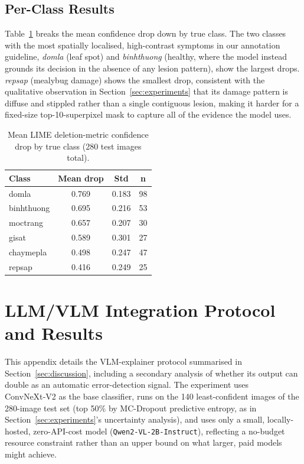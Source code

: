 \subsection{Per-Class Results}

Table~\ref{tab:lime_per_class} breaks the mean confidence drop down by true class. The two classes with the most spatially localised, high-contrast symptoms in our annotation guideline, \textit{domla} (leaf spot) and \textit{binhthuong} (healthy, where the model instead grounds its decision in the absence of any lesion pattern), show the largest drops. \textit{repsap} (mealybug damage) shows the smallest drop, consistent with the qualitative observation in Section~\ref{sec:experiments} that its damage pattern is diffuse and stippled rather than a single contiguous lesion, making it harder for a fixed-size top-10-superpixel mask to capture all of the evidence the model uses.

\begin{table}[htbp]
\centering
\caption{Mean LIME deletion-metric confidence drop by true class (280 test images total).}
\label{tab:lime_per_class}
\small
\begin{tabular}{lccc}
\toprule
\textbf{Class} & \textbf{Mean drop} & \textbf{Std} & \textbf{n} \\
\midrule
domla       & 0.769 & 0.183 & 98 \\
binhthuong  & 0.695 & 0.216 & 53 \\
moctrang    & 0.657 & 0.207 & 30 \\
gisat       & 0.589 & 0.301 & 27 \\
chaymepla   & 0.498 & 0.247 & 47 \\
repsap      & 0.416 & 0.249 & 25 \\
\bottomrule
\end{tabular}
\end{table}


\section{LLM/VLM Integration Protocol and Results}
\label{app:llm}

This appendix details the VLM-explainer protocol summarised in Section~\ref{sec:discussion}, including a secondary analysis of whether its output can double as an automatic error-detection signal. The experiment uses ConvNeXt‑V2 as the base classifier, runs on the 140 least-confident images of the 280-image test set (top 50\% by MC-Dropout predictive entropy, as in Section~\ref{sec:experiments}'s uncertainty analysis), and uses only a small, locally-hosted, zero-API-cost model (\texttt{Qwen2-VL-2B-Instruct}), reflecting a no-budget resource constraint rather than an upper bound on what larger, paid models might achieve.

